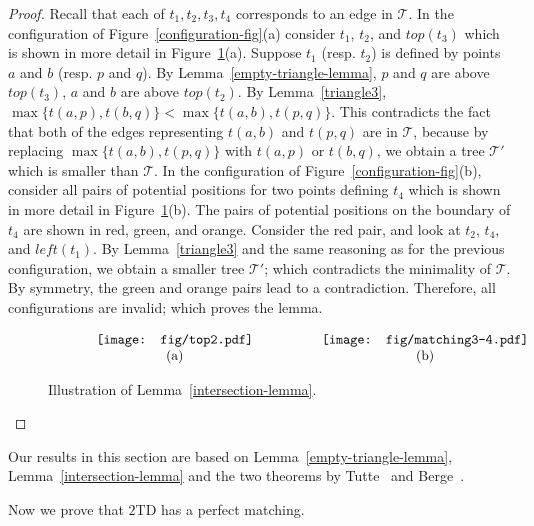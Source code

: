 \documentclass[11pt,a4paper]{article}
\newcommand{\kTD}[2]{$#1$\text{-}TD#2}
\begin{document}
\begin{proof}
 Recall that each of $t_1,t_2,t_3,t_4$ corresponds to an edge in $\mathcal{T}$. In the configuration of Figure~\ref{configuration-fig}(a) consider $t_1$, $t_2$, and $top(t_3)$ which is shown in more detail in Figure~\ref{matching3-fig}(a). Suppose $t_1$ (resp. $t_2$) is defined by points $a$ and $b$ (resp. $p$ and $q$). By Lemma~\ref{empty-triangle-lemma}, $p$ and $q$ are above $top(t_3)$, $a$ and $b$ are above $top(t_2)$. By Lemma~\ref{triangle3}, $\max\{t(a,p),t(b,q)\} <\max\{t(a,b), t(p,q)\}$. This contradicts the fact that both of the edges representing $t(a,b)$ and $t(p,q)$ are in $\mathcal{T}$, because by replacing $\max\{t(a,b), t(p,q)\}$ with $t(a,p)$ or $t(b,q)$, we obtain a tree $\mathcal{T'}$ which is smaller than $\mathcal{T}$. In the configuration of Figure~\ref{configuration-fig}(b), consider all pairs of potential positions for two points defining $t_4$ which is shown in more detail in Figure~\ref{matching3-fig}(b). The pairs of potential positions on the boundary of $t_4$ are shown in red, green, and orange. Consider the red pair, and look at $t_2$, $t_4$, and $left(t_1)$. By Lemma~\ref{triangle3} and the same reasoning as for the previous configuration, we obtain a smaller tree $\mathcal{T'}$;  which contradicts the minimality of $\mathcal{T}$. By symmetry, the green and orange pairs lead to a contradiction.
Therefore, all configurations are invalid; which proves the lemma.



\begin{figure}[htb]
  \centering
\setlength{\tabcolsep}{0in}
  $\begin{tabular}{cc}
 \multicolumn{1}{m{.5\columnwidth}}{\centering\texttt{[image: fig/top2.pdf]}}
&\multicolumn{1}{m{.5\columnwidth}}{\centering\texttt{[image: fig/matching3-4.pdf]}}\\
(a) & (b)
\end{tabular}$
  \caption{Illustration of Lemma~\ref{intersection-lemma}.}
\label{matching3-fig}
\end{figure}
\end{proof}

Our results in this section are based on Lemma~\ref{empty-triangle-lemma}, Lemma~\ref{intersection-lemma} and the two theorems by Tutte~\cite{Tutte1947} and Berge~\cite{Berge1958}. 

Now we prove that \kTD{2}{} has a perfect matching.
\end{document}
